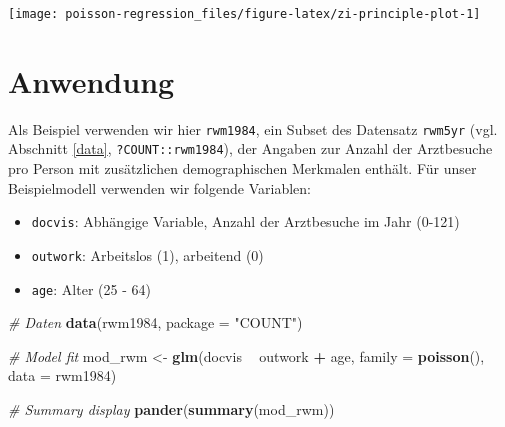 \documentclass[ngerman,a4paper,]{scrartcl}
\newenvironment{Shaded}{\begin{snugshade}}{\end{snugshade}}
\newcommand{\CommentTok}[1]{\textcolor[rgb]{0.56,0.35,0.01}{\textit{#1}}}
\newcommand{\DataTypeTok}[1]{\textcolor[rgb]{0.13,0.29,0.53}{#1}}
\newcommand{\KeywordTok}[1]{\textcolor[rgb]{0.13,0.29,0.53}{\textbf{#1}}}
\newcommand{\NormalTok}[1]{#1}
\newcommand{\OperatorTok}[1]{\textcolor[rgb]{0.81,0.36,0.00}{\textbf{#1}}}
\newcommand{\StringTok}[1]{\textcolor[rgb]{0.31,0.60,0.02}{#1}}
\providecommand{\tightlist}{%
  \setlength{\itemsep}{0pt}\setlength{\parskip}{0pt}}
\theoremstyle{definition}
\theoremstyle{definition}
\theoremstyle{definition}
\theoremstyle{remark}
\begin{document}
\begin{center}\texttt{[image: poisson-regression\_files/figure-latex/zi-principle-plot-1]} \end{center}

\hypertarget{anwendung}{%
\section{Anwendung}\label{anwendung}}

Als Beispiel verwenden wir hier \texttt{rwm1984}, ein Subset des Datensatz \texttt{rwm5yr} (vgl. Abschnitt \ref{data}, \texttt{?COUNT::rwm1984}), der Angaben zur Anzahl der Arztbesuche pro Person mit zusätzlichen demographischen Merkmalen enthält. Für unser Beispielmodell verwenden wir folgende Variablen:

\begin{itemize}
\tightlist
\item
  \texttt{docvis}: Abhängige Variable, Anzahl der Arztbesuche im Jahr (0-121)
\item
  \texttt{outwork}: Arbeitslos (1), arbeitend (0)
\item
  \texttt{age}: Alter (25 - 64)
\end{itemize}

\begin{Shaded}
\begin{Highlighting}[]
\CommentTok{# Daten}
\KeywordTok{data}\NormalTok{(rwm1984, }\DataTypeTok{package =} \StringTok{"COUNT"}\NormalTok{)}

\CommentTok{# Model fit}
\NormalTok{mod_rwm <-}\StringTok{ }\KeywordTok{glm}\NormalTok{(docvis }\OperatorTok{~}\StringTok{ }\NormalTok{outwork }\OperatorTok{+}\StringTok{ }\NormalTok{age, }\DataTypeTok{family =} \KeywordTok{poisson}\NormalTok{(), }\DataTypeTok{data =}\NormalTok{ rwm1984)}

\CommentTok{# Summary display}
\KeywordTok{pander}\NormalTok{(}\KeywordTok{summary}\NormalTok{(mod_rwm))}
\end{Highlighting}
\end{Shaded}
\end{document}
